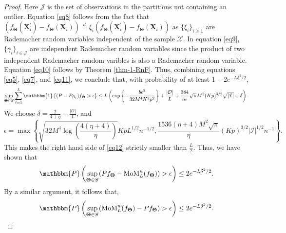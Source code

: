 \documentclass{article}
\newcommand{\bX}{\boldsymbol{X}}
\newcommand{\bTheta}{\boldsymbol{\Theta}}
\newcommand{\I}{\mathcal{I}}
\newcommand{\J}{\mathcal{J}}
\newcommand{\cO}{\mathcal{O}}
\newcommand{\sP}{\mathbbm{P}}
\newcommand{\one}{\mathbbm{1}}
\begin{document}
\begin{proof}
Here $\J$ is the set of observations in the partitions not containing an outlier. Equation \eqref{eq8} follows from the fact that  $(f_{\bTheta}(\bX_i^\prime)-f_{\bTheta}(\bX_i)) \overset{d}{=} \xi_i(f_{\bTheta}(\bX_i^\prime)-f_{\bTheta}(\bX_i))$ as $\{\xi_i\}_{i\ge 1}$ are Rademacher random variables independent of the sample $\mathcal{X}$. In equation \eqref{eq9}, $\{\gamma_i\}_{i \in \mathcal{J}}$ are independent Rademacher random variables since the product of two independent Rademacher random varibles is also a Rademacher random variable. Equation \eqref{eq10} follows by Theorem \ref{thm-1-RnF}.
Thus, combining equations \eqref{eq5}, \eqref{eq7}, and \eqref{eq11}, we conclude that,  with probability of at least $1-2e^{-L \delta^2/2}$, 
\begin{equation}
    \sup_{\bTheta \in \mathscr{G}}\sum_{\ell = 1}^L \one\left\{(P-P_{B_\ell})f_{\bTheta} > \epsilon\right\} \le  L \left( \exp\left\{-\frac{b \epsilon^2}{32  M^4 K^2 p^2}\right\}+ \frac{|\cO|}{L} + \frac{384}{n \epsilon}  \sqrt{\pi} M^2  (Kp)^{3/2} \sqrt{|\I|} + \delta\right). \label{eq12}
\end{equation}
We choose $\delta = \frac{2}{4+\eta} - \frac{|\cO|}{L}$, and $$\epsilon = \max\left\{\sqrt{32  M^4 \log\left(\frac{4(\eta+4)}{\eta}\right)}KpL^{1/2}n^{-1/2}, \frac{1536(\eta+4)  M^2 \sqrt{\pi}}{\eta} (Kp)^{3/2} |\I|^{1/2}n^{-1}\right\}.$$ This makes the right hand side of \eqref{eq12} strictly smaller than $\frac{L}{2}$.
Thus, we have shown that 
\begin{align*}
     \sP\left( \sup_{\bTheta \in \mathscr{G}} (Pf_{\bTheta} - \text{MoM}^n_L (f_{\bTheta}))> \epsilon \right) \le 2e^{-L \delta^2/2}.
 \end{align*}
By a similar argument, it follows that,
\begin{align*}
    \sP\left( \sup_{\bTheta \in \mathscr{G}} (\text{MoM}^n_L (f_{\bTheta}) -Pf_{\bTheta} ) > \epsilon \right) \le 2e^{-L \delta^2/2}.
\end{align*}

\end{proof}
\end{document}
